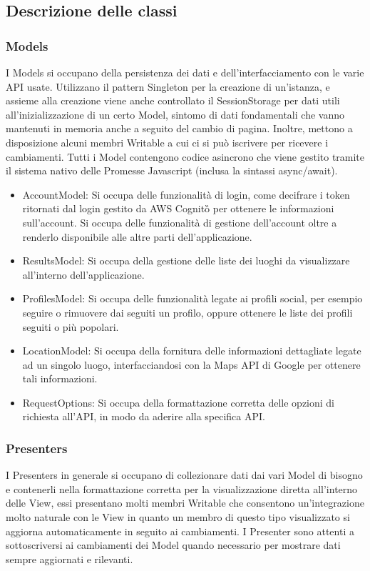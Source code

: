 \subsection{Descrizione delle classi}
    \subsubsection{Models}
        I Models si occupano della persistenza dei dati e dell'interfacciamento con le varie API usate. Utilizzano il pattern Singleton per la creazione di un'istanza, e assieme alla creazione viene anche controllato il SessionStorage 
        per dati utili all'inizializzazione di un certo Model, sintomo di dati fondamentali che vanno mantenuti in memoria anche a seguito del cambio di pagina. Inoltre, mettono a disposizione alcuni membri Writable a cui ci si può iscrivere per ricevere i cambiamenti.
        Tutti i Model contengono codice asincrono che viene gestito tramite il sistema nativo delle Promesse Javascript (inclusa la sintassi async/await).
        \begin{itemize}
            \item AccountModel: Si occupa delle funzionalità di login, come decifrare i token ritornati dal login gestito da AWS Cognito\G{} per ottenere le informazioni sull'account. Si occupa delle funzionalità di gestione dell'account oltre a renderlo disponibile alle altre parti dell'applicazione.
            \item ResultsModel: Si occupa della gestione delle liste dei luoghi da visualizzare all'interno dell'applicazione.
            \item ProfilesModel: Si occupa delle funzionalità legate ai profili social, per esempio seguire o rimuovere dai seguiti un profilo, oppure ottenere le liste dei profili seguiti o più popolari.
            \item LocationModel: Si occupa della fornitura delle informazioni dettagliate legate ad un singolo luogo, interfacciandosi con la Maps API di Google per ottenere tali informazioni.
            \item RequestOptions: Si occupa della formattazione corretta delle opzioni di richiesta all'API, in modo da aderire alla specifica API.
        \end{itemize}
    \subsubsection{Presenters}
        I Presenters in generale si occupano di collezionare dati dai vari Model di bisogno e contenerli nella formattazione corretta per la visualizzazione diretta all'interno delle View, essi presentano molti membri Writable che consentono
        un'integrazione molto naturale con le View in quanto un membro di questo tipo visualizzato si aggiorna automaticamente in seguito ai cambiamenti. I Presenter sono attenti a sottoscriversi ai cambiamenti dei Model quando necessario per mostrare dati sempre aggiornati e rilevanti.
